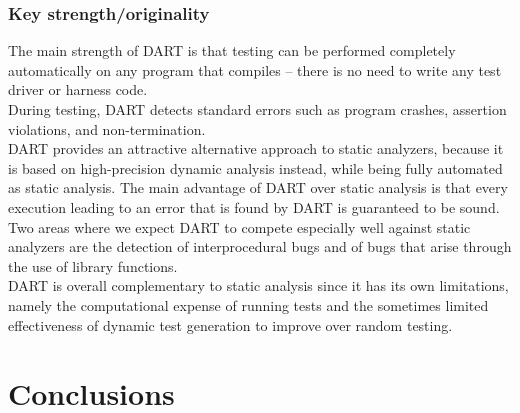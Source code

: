 \documentclass[11pt]{article}
\begin{document}
	    \subsubsection{Key strength/originality}
	    	The main strength of DART is that testing can be performed completely automatically on any program that compiles – there is no need to write any test driver or harness code.\\
	    	During testing, DART detects standard errors such as program crashes, assertion violations, and non-termination.\\
	    	DART provides an attractive alternative approach to static analyzers, because it is based on high-precision dynamic analysis instead, while being fully automated as static analysis. The main advantage of DART over static analysis is that every execution leading to an error that is found by DART is guaranteed to be sound. Two areas where we expect DART to compete especially well against static analyzers are the detection of interprocedural bugs and of bugs that arise through the use of library functions.\\

	    	DART is overall complementary to static analysis since it has its own limitations, namely the computational expense of running tests and the sometimes limited effectiveness of dynamic test generation to improve over random testing.


  \section{Conclusions}


\pagebreak
{}

\end{document}
